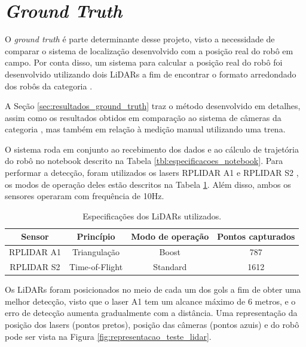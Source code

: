 \documentclass[acronym, symbols, table]{fei}
\begin{document}
	\section{\textit{Ground Truth}}\label{sec:metodologia_ground_truth}
	
	O \textit{ground truth} é parte determinante desse projeto, visto a necessidade de comparar o sistema de localização desenvolvido com a posição real do robô em campo. Por conta disso, um sistema para calcular a posição real do robô foi desenvolvido utilizando dois LiDARs a fim de encontrar o formato arredondado dos robôs da categoria .
	
	A Seção \ref{sec:resultados_ground_truth} traz o método desenvolvido em detalhes, assim como os resultados obtidos em comparação ao sistema de câmeras da categoria , mas também em relação à medição manual utilizando uma trena.
	
	O sistema roda em conjunto ao recebimento dos dados e ao cálculo de trajetória do robô no notebook descrito na Tabela \ref{tbl:especificacoes_notebook}. Para performar a detecção, foram utilizados os lasers RPLIDAR A1 \cite{rplidar_a1} e RPLIDAR S2 \cite{rplidar_s2}, os modos de operação deles estão descritos na Tabela \ref{tbl:especificacoes_laser}. Além disso, ambos os sensores operaram com frequência de 10Hz.
	
	\begin{table}[!htb]
		\centering
		\caption{Especificações dos LiDARs utilizados.}
		\label{tbl:especificacoes_laser}
		\begin{tabular}{|c|c|c|c|}
			\hline
			Sensor 				& Princípio 		& Modo de operação 	& Pontos capturados\\ \hline
			RPLIDAR A1			& Triangulação 		& Boost 			& 787 \\ \hline
			RPLIDAR S2 			& Time-of-Flight 	& Standard		    & 1612 \\ \hline
		\end{tabular}
	\end{table}

	Os LiDARs foram posicionados no meio de cada um dos gols a fim de obter uma melhor detecção, visto que o laser A1 tem um alcance máximo de 6 metros, e o erro de detecção aumenta gradualmente com a distância. Uma representação da posição dos lasers (pontos pretos), posição das câmeras (pontos azuis) e do robô pode ser vista na Figura \ref{fig:representacao_teste_lidar}.
	
\end{document}
